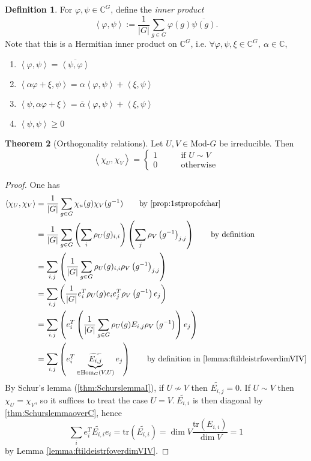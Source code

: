 \documentclass{article}
\newcommand{\tr}{\text{tr}}
\newcommand{\la}{\left\langle}
\newcommand{\ra}{\right\rangle}
\newcommand{\C}{\mathbb{C}}
\newcommand{\Hom}{\text{Hom}}
\newcommand{\Mod}{\text{Mod-}}
\theoremstyle{definition}
\newtheorem{defn}{Definition}[subsection]
\newtheorem{thm}[defn]{Theorem}
\begin{document}
\begin{defn}
For $\varphi,\psi\in\C^G$, define the \textit{inner product}
\[
\la \varphi,\psi\ra:=\frac{1}{|G|}\sum_{g\in G}\varphi(g)\overline{\psi(g)}.
\]
Note that this is a Hermitian inner product on $\C^G$, i.e. $\forall\varphi,\psi,\xi\in\C^G,\ \alpha\in\C$,
\begin{enumerate}
\item $\la\varphi,\psi\ra=\overline{\la\psi,\varphi\ra}$
\item $\la\alpha\varphi+\xi,\psi\ra=\alpha\la\varphi,\psi\ra+\la\xi,\psi\ra$
\item $\la\psi,\alpha\varphi+\xi\ra=\overline\alpha\la\varphi,\psi\ra+\la\xi,\psi\ra$
\item $\la\psi,\psi\ra\geq 0$
\end{enumerate}
\end{defn}

\begin{thm}[Orthogonality relations]
\label{thm:orthogonalityrelations}
Let $U,V\in\Mod G$ be irreducible. Then
\[
\la\chi_U,\chi_V\ra=\left\{ \begin{aligned}
  1 \qquad &\text{if }U\sim V\\
  0 \qquad &\text{otherwise}
\end{aligned} \right.
\]
\end{thm}
\begin{proof}
One has
\[
\begin{aligned}
\la\chi_U,\chi_V\ra&=\frac{1}{|G|}\sum_{g\in G}\chi_u(g)\chi_V(g^{-1}) \qquad \text{by \ref{prop:1stpropofchar}}\\
&=\frac{1}{|G|}\sum_{g\in G} \left(\sum_i\rho_U(g)_{i,i}\right)\left(\sum_j\rho_V\left(g^{-1}\right)_{j,j}\right)\qquad \text{by definition}\\
&=\sum_{i,j}\left(\frac{1}{|G|}\sum_{g\in G}\rho_U(g)_{i,i}\rho_V\left(g^{-1}\right)_{j,j}\right)\\
&=\sum_{i,j}\left(\frac{1}{|G|}e_i^T\rho_U(g)e_ie_j^T\rho_V\left(g^{-1}\right)e_j\right)\\
&=\sum_{i,j}\left(e_i^T\left(\frac{1}{|G|}\sum_{g\in G}\rho_U(g)E_{i,j}\rho_V\left(g^{-1}\right)\right)e_j\right)\\
&=\sum_{i,j}\left(e_i^T\underbrace{\widetilde{E_{i,j}}}_{\in\Hom_G(V,U)}e_j\right) \qquad \text{by definition in \ref{lemma:ftildeistrfoverdimVIV}}
\end{aligned}
\]
By Schur's lemma (\ref{thm:SchurslemmaI}), if $U\not\sim V$ then $\widetilde{E_{i,j}}=0$. If $U\sim V$ then $\chi_U=\chi_V$, so it suffices to treat the case $U=V.\ \widetilde{E_{i,i}}$ is then diagonal by \ref{thm:SchurslemmaoverC}, hence
\[
\sum_i e_i^T\widetilde{E_{i,i}}e_i=\tr\left(\widetilde{E_{i,i}}\right)=\dim V\frac{\tr(E_{i,i})}{\dim V}=1
\]
by Lemma \ref{lemma:ftildeistrfoverdimVIV}.
\end{proof}
\end{document}
